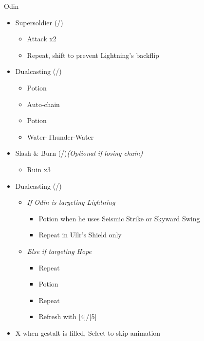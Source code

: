 \renewcommand{\first}{[1] Slash \& Burn (\com/\rav)}
\renewcommand{\second}{[2] Supersoldier (\com/\syn)}
\renewcommand{\fourth}{[4] Dualcasting (\rav/\rav)}
\renewcommand{\fifth}{[5] Dualcasting (\rav/\rav)}

\begin{battle}{Odin}
\begin{itemize}
    \item \second
    \begin{itemize}
        \item Attack x2
        \item Repeat, shift to prevent Lightning's backflip
    \end{itemize}
    \item \fourth
    \begin{itemize}
        \item Potion
        \item Auto-chain
        \item Potion
        \item Water-Thunder-Water
    \end{itemize}
	\item \first \textit{(Optional if losing chain)}
	\begin{itemize}
		\item Ruin x3
	\end{itemize}
    \item \fifth
    \begin{itemize}
        \item \textit{If Odin is targeting Lightning}
        \begin{itemize}
            \item Potion when he uses Seismic Strike or Skyward Swing
            \item Repeat in Ullr's Shield only
        \end{itemize}
        \item \textit{Else if targeting Hope}
        \begin{itemize}
            \item Repeat
            \item Potion
            \item Repeat
            \item Refresh with [4]/[5]
        \end{itemize}
    \end{itemize}
    \item X when gestalt is filled, Select to skip animation
\end{itemize}
\end{battle}

